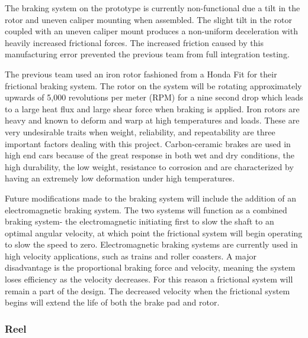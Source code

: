 The braking system on the prototype is currently non-functional due a tilt in the rotor and uneven caliper mounting when assembled. The slight tilt in the rotor coupled with an uneven caliper mount produces a non-uniform deceleration with heavily increased frictional forces. The increased friction caused by this manufacturing error prevented the previous team from full integration testing.

The previous team used an iron rotor fashioned from a Honda Fit for their frictional braking system. The rotor on the system will be rotating approximately upwards of 5,000 revolutions per meter (RPM) for a nine second drop which leads to a large heat flux and large shear force when braking is applied. Iron rotors are heavy and known to deform and warp at high temperatures and loads. These are very undesirable traits when weight, reliability, and repeatability are three important factors dealing with this project. Carbon-ceramic brakes are used in high end cars because of the great response in both wet and dry conditions, the high durability, the low weight, resistance to corrosion and are characterized by having an extremely low deformation under high temperatures.
% 
% 
% 

Future modifications made to the braking system will include the addition of an electromagnetic braking system. The two systems will function as a combined braking system- the electromagnetic initiating first to slow the shaft to an optimal angular velocity, at which point the frictional system will begin operating to slow the speed to zero. Electromagnetic braking systems are currently used in high velocity applications, such as trains and roller coasters. A major disadvantage is the proportional braking force and velocity, meaning the system loses efficiency as the velocity decreases. For this reason a frictional system will remain a part of the design. The decreased velocity when the frictional system begins will extend the life of both the brake pad and rotor.


\subsubsection{Reel}

